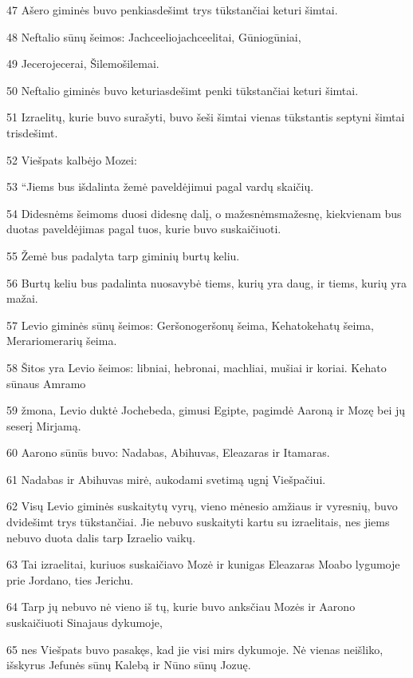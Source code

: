 \par 47 Ašero giminės buvo penkiasdešimt trys tūkstančiai keturi šimtai. 
\par 48 Neftalio sūnų šeimos: Jachceelio­jachceelitai, Gūnio­gūniai, 
\par 49 Jecero­jecerai, Šilemo­šilemai. 
\par 50 Neftalio giminės buvo keturiasdešimt penki tūkstančiai keturi šimtai. 
\par 51 Izraelitų, kurie buvo surašyti, buvo šeši šimtai vienas tūkstantis septyni šimtai trisdešimt. 
\par 52 Viešpats kalbėjo Mozei: 
\par 53 “Jiems bus išdalinta žemė paveldėjimui pagal vardų skaičių. 
\par 54 Didesnėms šeimoms duosi didesnę dalį, o mažesnėms­mažesnę, kiekvienam bus duotas paveldėjimas pagal tuos, kurie buvo suskaičiuoti. 
\par 55 Žemė bus padalyta tarp giminių burtų keliu. 
\par 56 Burtų keliu bus padalinta nuosavybė tiems, kurių yra daug, ir tiems, kurių yra mažai. 
\par 57 Levio giminės sūnų šeimos: Geršono­geršonų šeima, Kehato­kehatų šeima, Merario­merarių šeima. 
\par 58 Šitos yra Levio šeimos: libniai, hebronai, machliai, mušiai ir koriai. Kehato sūnaus Amramo 
\par 59 žmona, Levio duktė Jochebeda, gimusi Egipte, pagimdė Aaroną ir Mozę bei jų seserį Mirjamą. 
\par 60 Aarono sūnūs buvo: Nadabas, Abihuvas, Eleazaras ir Itamaras. 
\par 61 Nadabas ir Abihuvas mirė, aukodami svetimą ugnį Viešpačiui. 
\par 62 Visų Levio giminės suskaitytų vyrų, vieno mėnesio amžiaus ir vyresnių, buvo dvidešimt trys tūkstančiai. Jie nebuvo suskaityti kartu su izraelitais, nes jiems nebuvo duota dalis tarp Izraelio vaikų. 
\par 63 Tai izraelitai, kuriuos suskaičiavo Mozė ir kunigas Eleazaras Moabo lygumoje prie Jordano, ties Jerichu. 
\par 64 Tarp jų nebuvo nė vieno iš tų, kurie buvo anksčiau Mozės ir Aarono suskaičiuoti Sinajaus dykumoje, 
\par 65 nes Viešpats buvo pasakęs, kad jie visi mirs dykumoje. Nė vienas neišliko, išskyrus Jefunės sūnų Kalebą ir Nūno sūnų Jozuę.



